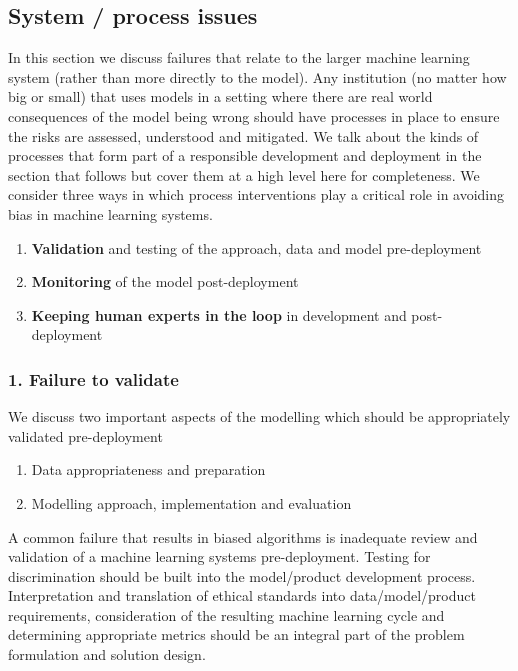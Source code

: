 \subsection{System / process issues}

In this section we discuss failures that relate to the larger machine learning system (rather than more directly to the model). Any institution (no matter how big or small) that uses models in a setting where there are real world consequences of the model being wrong should have processes in place to ensure the risks are assessed, understood and mitigated. We talk about the kinds of processes that form part of a responsible development and deployment in the section that follows but cover them at a high level here for completeness. We consider three ways in which process interventions play a critical role in avoiding bias in machine learning systems.
\begin{enumerate}
\item \textbf{Validation} and testing of the approach, data and model pre-deployment
\item \textbf{Monitoring} of the model post-deployment
\item \textbf{Keeping human experts in the loop} in development and post-deployment
\end{enumerate}

\subsubsection*{1. Failure to validate}

We discuss two important aspects of the modelling which should be appropriately validated pre-deployment
%
\begin{enumerate}
\item Data appropriateness and preparation
\item Modelling approach, implementation and evaluation
\end{enumerate}

A common failure that results in biased algorithms is inadequate review and validation of a machine learning systems pre-deployment. Testing for discrimination should be built into the model/product development process. Interpretation and translation of ethical standards into data/model/product requirements, consideration of the resulting machine learning cycle and determining appropriate metrics should be an integral part of the problem formulation and solution design.


